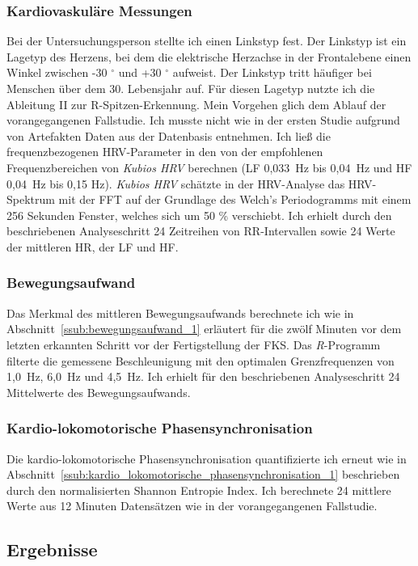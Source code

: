 \subsubsection{Kardiovaskuläre Messungen}
Bei der Untersuchungsperson stellte ich einen Linkstyp fest. Der Linkstyp ist ein Lagetyp des Herzens, bei dem die elektrische Herzachse in der Frontalebene einen Winkel zwischen -30 $^{\circ}$ und +30 $^{\circ}$ aufweist. Der Linkstyp tritt häufiger bei Menschen über dem 30. Lebensjahr auf. Für diesen Lagetyp nutzte ich die Ableitung II zur R-Spitzen-Erkennung. Mein Vorgehen glich dem Ablauf der vorangegangenen Fallstudie. Ich musste nicht wie in der ersten Studie aufgrund von Artefakten Daten aus der Datenbasis entnehmen. Ich ließ die frequenzbezogenen \ac{HRV}-Parameter in den von der \citet[][S.~360]{TaskForce1996} empfohlenen Frequenzbereichen von \emph{Kubios HRV} berechnen (\ac{LF} 0,033~Hz bis 0,04~Hz und \ac{HF} 0,04~Hz bis 0,15 Hz). \emph{Kubios HRV} schätzte in der \ac{HRV}-Analyse das \ac{HRV}-Spektrum mit der \acs{FFT} auf der Grundlage des Welch’s Periodogramms mit einem 256 Sekunden Fenster, welches sich um 50 \% verschiebt. Ich erhielt durch den beschriebenen Analyseschritt 24 Zeitreihen von RR-Intervallen sowie 24 Werte der mittleren \ac{HR}, der \ac{LF} und \ac{HF}.

\subsubsection{Bewegungsaufwand}
Das Merkmal des mittleren Bewegungsaufwands berechnete ich wie in Abschnitt~\ref{ssub:bewegungsaufwand_1} erläutert für die zwölf Minuten vor dem letzten erkannten Schritt vor der Fertigstellung der \ac{FKS}. Das \emph{R}-Programm filterte die gemessene Beschleunigung mit den optimalen Grenzfrequenzen von 1,0~Hz, 6,0~Hz und 4,5~Hz. Ich erhielt für den beschriebenen Analyseschritt 24 Mittelwerte des Bewegungsaufwands. 

\subsubsection{Kardio-lokomotorische Phasensynchronisation}
Die kardio-lokomotorische Phasensynchronisation quantifizierte ich erneut wie in Abschnitt~\ref{ssub:kardio_lokomotorische_phasensynchronisation_1} beschrieben durch den normalisierten Shannon Entropie Index. Ich berechnete 24 mittlere Werte aus 12 Minuten Datensätzen wie in der vorangegangenen Fallstudie.

\subsection{Ergebnisse}
